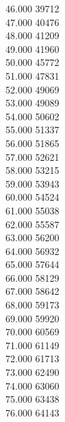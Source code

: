 { 46.000	39712 \\
 47.000	40476 \\
 48.000	41209 \\
 49.000	41960 \\
 50.000	45772 \\
 51.000	47831 \\
 52.000	49069 \\
 53.000	49089 \\
 54.000	50602 \\
 55.000	51337 \\
 56.000	51865 \\
 57.000	52621 \\
 58.000	53215 \\
 59.000	53943 \\
 60.000	54524 \\
 61.000	55038 \\
 62.000	55587 \\
 63.000	56200 \\
 64.000	56932 \\
 65.000	57644 \\
 66.000	58129 \\
 67.000	58642 \\
 68.000	59173 \\
 69.000	59920 \\
 70.000	60569 \\
 71.000	61149 \\
 72.000	61713 \\
 73.000	62490 \\
 74.000	63060 \\
 75.000	63438 \\
 76.000	64143 \\
}
